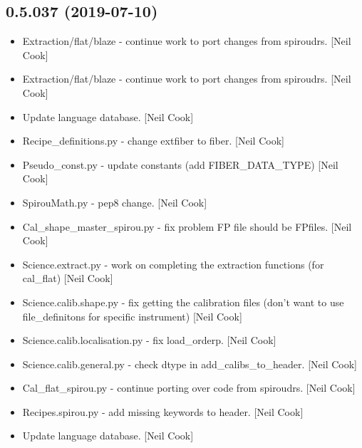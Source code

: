 \documentclass[a4paper,10pt,english]{report}
\begin{document}
\subsection{0.5.037 (2019-07-10)}
\label{\detokenize{misc/changelog:id102}}\begin{itemize}
\item {} 
Extraction/flat/blaze - continue work to port changes from spiroudrs.
{[}Neil Cook{]}

\item {} 
Extraction/flat/blaze - continue work to port changes from spiroudrs.
{[}Neil Cook{]}

\item {} 
Update language database. {[}Neil Cook{]}

\item {} 
Recipe\_definitions.py - change \textendash{}extfiber to \textendash{}fiber. {[}Neil Cook{]}

\item {} 
Pseudo\_const.py - update constants (add FIBER\_DATA\_TYPE) {[}Neil Cook{]}

\item {} 
SpirouMath.py - pep8 change. {[}Neil Cook{]}

\item {} 
Cal\_shape\_master\_spirou.py - fix problem FP file should be FPfiles.
{[}Neil Cook{]}

\item {} 
Science.extract.py - work on completing the extraction functions (for
cal\_flat) {[}Neil Cook{]}

\item {} 
Science.calib.shape.py - fix getting the calibration files (don’t want
to use file\_definitons for specific instrument) {[}Neil Cook{]}

\item {} 
Science.calib.localisation.py - fix load\_orderp. {[}Neil Cook{]}

\item {} 
Science.calib.general.py - check dtype in add\_calibs\_to\_header. {[}Neil
Cook{]}

\item {} 
Cal\_flat\_spirou.py - continue porting over code from spiroudrs. {[}Neil
Cook{]}

\item {} 
Recipes.spirou.py - add missing keywords to header. {[}Neil Cook{]}

\item {} 
Update language database. {[}Neil Cook{]}


\end{itemize}
\end{document}
